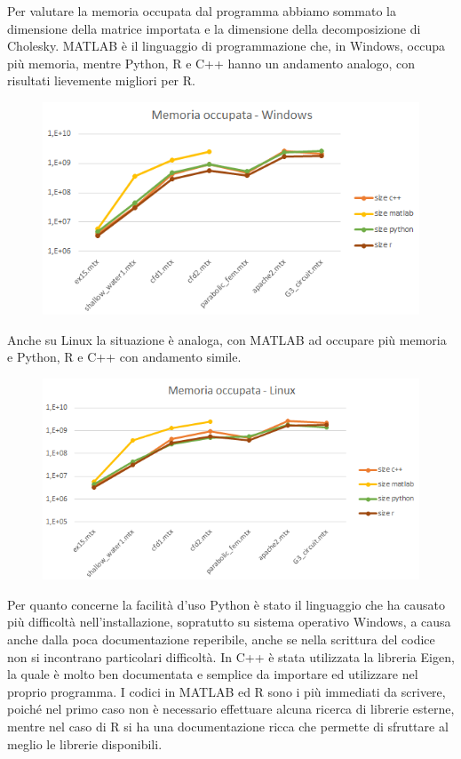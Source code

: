 \documentclass[a4paper,10pt]{article}
\begin{document}
Per valutare la memoria occupata dal programma abbiamo sommato la dimensione della matrice importata e la dimensione della decomposizione di Cholesky. MATLAB è il linguaggio di programmazione che, in Windows, occupa più memoria, mentre Python, R e C++ hanno un andamento analogo, con risultati lievemente migliori per R.

\begin{figure}[H]
\centering
  \includegraphics[width=0.5\linewidth]{img/memoccwin.png}
\end{figure}

Anche su Linux la situazione è analoga, con MATLAB ad occupare più memoria e Python, R e C++ con andamento simile.

\begin{figure}[H]
\centering
  \includegraphics[width=0.5\linewidth]{img/memocclinux.png}
\end{figure}


Per quanto concerne la facilità d'uso Python è stato il linguaggio che ha causato più difficoltà nell'installazione, sopratutto su sistema operativo Windows, a causa anche dalla poca documentazione reperibile, anche se nella scrittura del codice non si incontrano particolari difficoltà. In C++ è stata utilizzata la libreria Eigen, la quale è molto ben documentata e semplice da importare ed utilizzare nel proprio programma.
I codici in MATLAB ed R sono i più immediati da scrivere, poiché nel primo caso non è necessario effettuare alcuna ricerca di librerie esterne, mentre nel caso di R si ha una documentazione ricca che permette di sfruttare al meglio le librerie disponibili.
\end{document}
